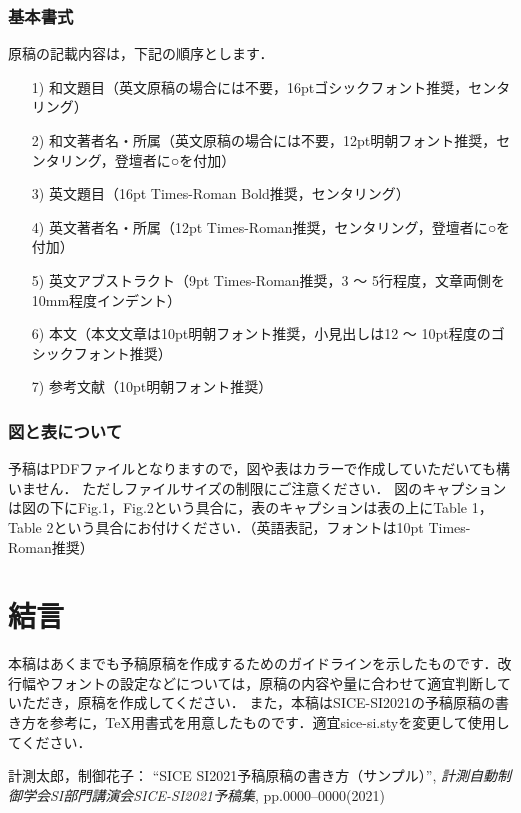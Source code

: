 \documentclass[a4paper]{jarticle}
\begin{document}
\subsubsection{基本書式}
原稿の記載内容は，下記の順序とします．
\begin{enumerate}
\setlength{\parskip}{0cm} %
\setlength{\itemsep}{0cm} %
\item[1)] 和文題目（英文原稿の場合には不要，16ptゴシックフォント推奨，センタリング）
\item[2)] 和文著者名・所属（英文原稿の場合には不要，12pt明朝フォント推奨，センタリング，登壇者に○を付加）
\item[3)] 英文題目（16pt Times-Roman Bold推奨，センタリング）
\item[4)] 英文著者名・所属（12pt Times-Roman推奨，センタリング，登壇者に○を付加）
\item[5)] 英文アブストラクト（9pt Times-Roman推奨，3 〜 5行程度，文章両側を10mm程度インデント）
\item[6)] 本文（本文文章は10pt明朝フォント推奨，小見出しは12 〜 10pt程度のゴシックフォント推奨）
\item[7)] 参考文献（10pt明朝フォント推奨）
\end{enumerate}
\subsubsection{図と表について}
予稿はPDFファイルとなりますので，図や表はカラーで作成していただいても構いません．
ただしファイルサイズの制限にご注意ください．
図のキャプションは図の下にFig.1，Fig.2という具合に，表のキャプションは表の上にTable 1，Table 2という具合にお付けください．（英語表記，フォントは10pt Times-Roman推奨）
%
\section{結言}
本稿はあくまでも予稿原稿を作成するためのガイドラインを示したものです．改行幅やフォントの設定などについては，原稿の内容や量に合わせて適宜判断していただき，原稿を作成してください．
また，本稿はSICE-SI2021の予稿原稿の書き方\cite{SI2021}を参考に，\TeX 用書式を用意したものです．適宜sice-si.styを変更して使用してください．
%
%
\begin{thebibliography}{99}
	計測太郎，制御花子：
	``SICE SI2021予稿原稿の書き方（サンプル）'',  
   {\it 計測自動制御学会SI部門講演会SICE-SI2021予稿集}, 
    pp.0000--0000(2021)
\end{thebibliography}
%
%
%
\end{document}
